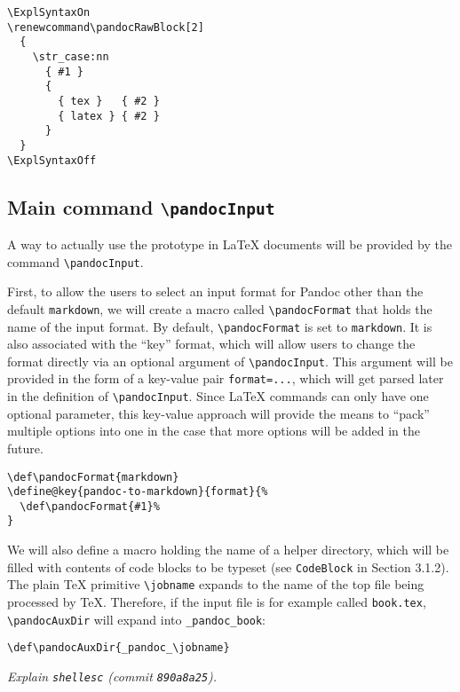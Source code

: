 \documentclass[
  digital,     %
  oneside,     %
  nosansbold,  %
  nocolorbold, %
  lof,         %
  nolot,       %
]{fithesis4}
\newcommand\macro[1]{\texttt{\textbackslash{}{#1}}}
\begin{document}
\noindent
\lstset{language=[LaTeX]TeX}
\begin{lstlisting}
\ExplSyntaxOn
\renewcommand\pandocRawBlock[2]
  {
    \str_case:nn
      { #1 }
      {
        { tex }   { #2 }
        { latex } { #2 }
      }
  }
\ExplSyntaxOff
\end{lstlisting}

\subsection{Main command \macro{pandocInput}}
A way to actually use the prototype in \LaTeX{} documents will be provided by the command \macro{pandocInput}.

First, to allow the users to select an input format for Pandoc other than the default \texttt{markdown}, we will create a macro called \macro{pandocFormat} that holds the name of the input format. By default, \macro{pandocFormat} is set to \texttt{markdown}. It is also associated with the ``key'' format, which will allow users to change the format directly via an optional argument of \macro{pandocInput}. This argument will be provided in the form of a key-value pair \texttt{format=...}, which will get parsed later in the definition of \macro{pandocInput}. Since \LaTeX{} commands can only have one optional parameter, this key-value approach will provide the means to ``pack'' multiple options into one in the case that more options will be added in the future.

\noindent
\lstset{language=[LaTeX]TeX}
\begin{lstlisting}
\def\pandocFormat{markdown}
\define@key{pandoc-to-markdown}{format}{%
  \def\pandocFormat{#1}%
}
\end{lstlisting}

\noindent
We will also define a macro holding the name of a helper directory, which will be filled with contents of code blocks to be typeset (see \texttt{CodeBlock} in Section 3.1.2). The plain \TeX{} primitive \macro{jobname} expands to the name of the top file being processed by \TeX{}. Therefore, if the input file is for example called \texttt{book.tex}, \macro{pandocAuxDir} will expand into \texttt{\_pandoc\_book}:

\noindent
\lstset{language=[LaTeX]TeX}
\begin{lstlisting}
\def\pandocAuxDir{_pandoc_\jobname}
\end{lstlisting}

\noindent
\emph{Explain \texttt{shellesc} (commit \texttt{890a8a25}).}
\end{document}
